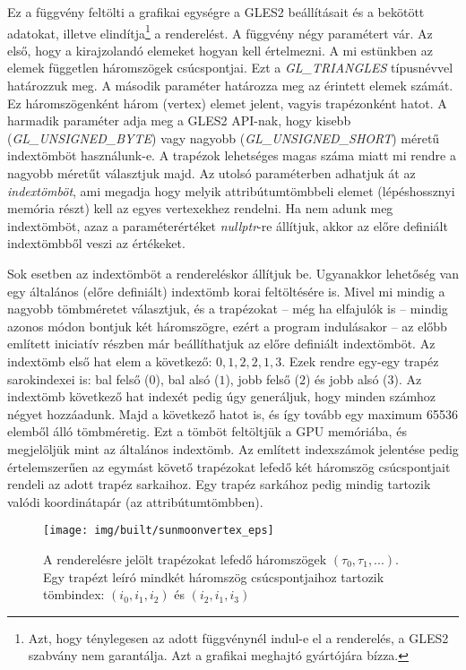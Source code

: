 \documentclass[12pt]{report}
\theoremstyle{definition}
\newcommand{\func}[1]{{\textsl{#1}}}
\begin{document}
Ez a függvény feltölti a grafikai egységre a GLES2 beállításait és a bekötött
adatokat, illetve elindítja\footnote{Azt, hogy ténylegesen az adott függvénynél
indul-e el a renderelés, a GLES2 szabvány nem garantálja. Azt a grafikai
meghajtó gyártójára bízza.} a renderelést. A függvény négy paramétert vár. Az
első, hogy a kirajzolandó elemeket hogyan kell értelmezni. A mi estünkben az
elemek független háromszögek csúcspontjai. Ezt a \func{GL\_TRIANGLES}
típusnévvel határozzuk meg. A második paraméter határozza meg az érintett
elemek számát. Ez háromszögenként három (vertex) elemet jelent, vagyis
trapézonként hatot. A harmadik paraméter adja meg a GLES2 API-nak, hogy kisebb
(\func{GL\_UNSIGNED\_BYTE}) vagy nagyobb (\func{GL\_UNSIGNED\_SHORT}) méretű
indextömböt használunk-e. A trapézok lehetséges magas száma miatt mi rendre a
nagyobb méretűt választjuk majd. Az utolsó paraméterben adhatjuk át az
\emph{indextömböt}, ami megadja hogy melyik attribútumtömbbeli elemet (lépéshossznyi
memória részt) kell az egyes vertexekhez rendelni. Ha nem adunk meg
indextömböt, azaz a paraméterértéket \func{nullptr}-re állítjuk, akkor
az előre definiált indextömbből veszi az értékeket.

Sok esetben az indextömböt a rendereléskor állítjuk be. Ugyanakkor lehetőség
van egy általános (előre definiált) indextömb korai feltöltésére is. Mivel mi
mindig a nagyobb tömbméretet választjuk, és a trapézokat -- még ha elfajulók is
-- mindig azonos módon bontjuk két háromszögre, ezért a program indulásakor --
az előbb említett iniciatív részben már beállíthatjuk az előre definiált
indextömböt. Az indextömb első hat elem a következő: $0, 1, 2, 2, 1, 3$. Ezek
rendre egy-egy trapéz sarokindexei is: bal felső ($0$), bal alsó ($1$), jobb
felső ($2$) és jobb alsó ($3$). Az indextömb következő hat indexét pedig úgy
generáljuk, hogy minden számhoz négyet hozzáadunk. Majd a következő hatot is,
és így tovább egy maximum 65536 elemből álló tömbméretig. Ezt a tömböt
feltöltjük a GPU memóriába, és megjelöljük mint az általános indextömb. Az
említett indexszámok jelentése pedig értelemszerűen az egymást követő
trapézokat lefedő két háromszög csúcspontjait rendeli az adott trapéz
sarkaihoz. Egy trapéz sarkához pedig mindig tartozik valódi koordinátapár (az
attribútumtömbben).

  \begin{figure}
    \centering
    \texttt{[image: img/built/sunmoonvertex\_eps]}
    \caption{\label{fig:sunmoonvertex}A renderelésre jelölt trapézokat lefedő
    háromszögek $(\tau_0, \tau_1, ...)$. Egy trapézt leíró mindkét háromszög
    csúcspontjaihoz tartozik tömbindex: $(i_0, i_1, i_2)$ és $(i_2, i_1, i_3)$}
  \end{figure}
\end{document}
